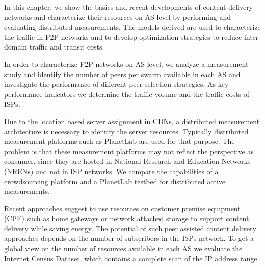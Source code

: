 
In this chapter, we show the basics and recent developments of content delivery networks and characterize their resources on AS level by performing and evaluating distributed measurements.
The models derived are used to characterize the traffic in P2P networks and to develop optimization strategies to reduce inter-domain traffic and transit costs.


In order to characterize P2P networks on AS level,
we analyze a measurement study and identify the number of peers per swarm available in each AS and investigate the performance of different peer selection strategies.
As key performance indicators we determine the traffic volume and the traffic costs of ISPs.

Due to the location based server assignment in CDNs, a distributed measurement architecture is necessary to identify the server resources.
Typically distributed measurement platforms such as PlanetLab are used for that purpose.
The problem is that these measurement platforms may not reflect the perspective as consumer, since they are hosted in National Research and Education Networks (NRENs) and not in ISP networks.
We compare the capabilities of a crowdsourcing platform and a PlanetLab testbed for distributed active measurements.

Recent approaches \cite{valancius2009greening} suggest to use resources on customer premise equipment (CPE) such as home gateways or network attached storage to support content delivery while saving energy.
The potential of such peer assisted content delivery approaches depends on the number of subscribers in the ISPs network.
To get a global view on the number of resources available in each AS we evaluate the Internet Census Dataset, which contains a complete scan of the IP address range.


